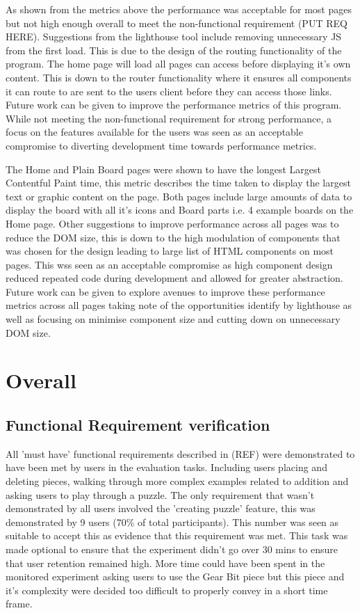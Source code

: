 \documentclass{l4proj}
\begin{document}
As shown from the metrics above the performance was acceptable for most pages but not high enough overall to meet the non-functional requirement (PUT REQ HERE). Suggestions from the lighthouse tool include removing unnecessary JS from the first load. This is due to the design of the routing functionality of the program. The home page will load all pages can access before displaying it's own content. This is down to the router functionality where it ensures all components it can route to are sent to the users client before they can access those links. Future work can be given to improve the performance metrics of this program. While not meeting the non-functional requirement for strong performance, a focus on the features available for the users was seen as an acceptable compromise to diverting development time towards performance metrics. 

The Home and Plain Board pages were shown to have the longest Largest Contentful Paint time, this metric describes the time taken to display the largest text or graphic content on the page. Both pages include large amounts of data to display the board with all it's icons and Board parts i.e. 4 example boards on the Home page. Other suggestions to improve performance across all pages was to reduce the DOM size, this is down to the high modulation of components that was chosen for the design leading to large list of HTML components on most pages. This wss seen as an acceptable compromise as high component design reduced repeated code during development and allowed for greater abstraction. Future work can be given to explore avenues to improve these performance metrics across all pages taking note of the opportunities identify by lighthouse as well as focusing on minimise component size and cutting down on unnecessary DOM size.   

\section{Overall}
\subsection{Functional Requirement verification}

All 'must have' functional requirements described in (REF) were demonstrated to have been met by users in the evaluation tasks. Including users placing and deleting pieces, walking through more complex examples related to addition and asking users to play through a puzzle. The only requirement that wasn't demonstrated by all users involved the 'creating puzzle' feature, this was demonstrated by 9 users (70\% of total participants). This number was seen as suitable to accept this as evidence that this requirement was met. This task was made optional to ensure that the experiment didn't go over 30 mins to ensure that user retention remained high. More time could have been spent in the monitored experiment asking users to use the Gear Bit piece but this piece and it's complexity were decided too difficult to properly convey in a short time frame. 
\end{document}
